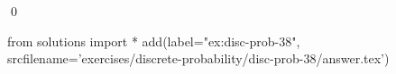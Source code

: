
\begin{ex} 
  \label{ex:disc-prob-38}
  
  \qed
\end{ex} 
\begin{python0}
from solutions import *
add(label="ex:disc-prob-38",
    srcfilename='exercises/discrete-probability/disc-prob-38/answer.tex') 
\end{python0}
